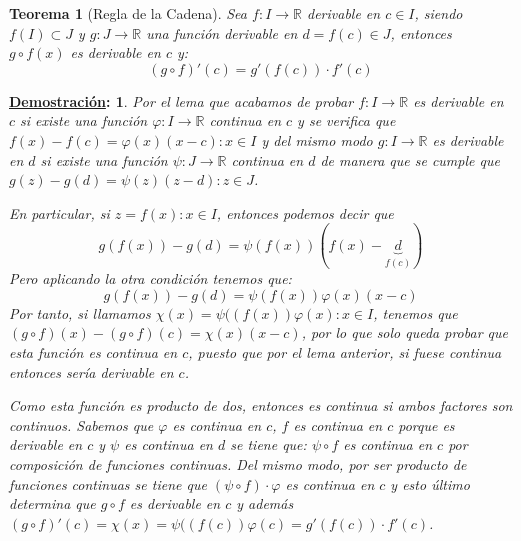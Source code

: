 \documentclass[10pt,a4paper,openright]{book}
\theoremstyle{break}
\newtheorem*{theo}{Teorema}
\newtheorem*{demo}{\underline{Demostración}:}
\begin{document}
\begin{theo}[Regla de la Cadena]
Sea $f: I \rightarrow \mathbb R $ derivable en $c\in I$, siendo $f(I)\subset J$ y $g: J\rightarrow \mathbb R$ una función derivable en $d=f(c)\in J$, entonces $g\circ f (x)$ es derivable en $c$ y:
$$(g\circ f)'(c)=g'(f(c))\cdot f'(c)$$
\end{theo}
\begin{demo}
Por el lema que acabamos de probar $f: I\rightarrow \mathbb R$ es derivable en $c$ si existe una función $\varphi: I\rightarrow \mathbb R$ continua en $c$ y se verifica que $f(x)-f(c)=\varphi(x)(x-c): x\in I$ y del mismo modo $g: I\rightarrow \mathbb R$ es derivable en $d$ si existe una función $\psi: J\rightarrow \mathbb R$ continua en $d$ de manera que se cumple que $g(z)-g(d)=\psi(z)(z-d): z\in J$.

En particular, si $z= f(x): x\in I$, entonces podemos decir que
$$g(f(x))-g(d)=\psi(f(x))(f(x)-\underbrace{d}_{f(c)})$$
Pero aplicando la otra condición tenemos que:
$$g(f(x))-g(d)=\psi(f(x))\varphi(x)(x-c)$$
Por tanto, si llamamos $\chi(x)= \psi((f(x))\varphi(x): x\in I$, tenemos que $(g\circ f)(x)-(g\circ f)(c)=\chi(x)(x-c)$, por lo que solo queda probar que esta función es continua en $c$, puesto que por el lema anterior, si fuese continua entonces sería derivable en $c$.

Como esta función es producto de dos, entonces es continua si ambos factores son continuos. Sabemos que $\varphi$ es continua en $c$, $f$ es continua en $c$ porque es derivable en $c$ y $\psi$ es continua en $d$ se tiene que: $\psi \circ f$ es continua en $c$ por composición de funciones continuas. Del mismo modo, por ser producto de funciones continuas se tiene que $(\psi \circ f)\cdot \varphi$ es continua en $c$ y esto último determina que $g\circ f$ es derivable en $c$ y además $(g\circ f)'(c)=\chi(x)= \psi((f(c))\varphi(c)=g'(f(c))\cdot f'(c)$.
\end{demo}
\end{document}
